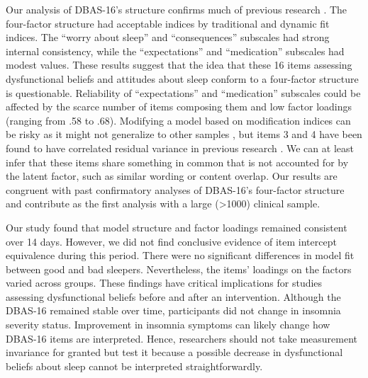 \documentclass[
  12pt,
  twoside,
  openright,
  a4paper,
  chapter=TITLE,
  section=TITLE,
  brazil]{abntex2}
\begin{document}
Our analysis of DBAS-16's structure confirms much of previous research
\autocite{morin2007a,castillo2023,boysan2010}. The four-factor structure
had acceptable indices by traditional and dynamic fit indices. The
``worry about sleep'' and ``consequences'' subscales had strong internal
consistency, while the ``expectations'' and ``medication'' subscales had
modest values. These results suggest that the idea that these 16 items
assessing dysfunctional beliefs and attitudes about sleep conform to a
four-factor structure is questionable. Reliability of ``expectations''
and ``medication'' subscales could be affected by the scarce number of
items composing them and low factor loadings (ranging from .58 to .68).
Modifying a model based on modification indices can be risky as it might
not generalize to other samples \autocite{maccallum1992}, but items 3
and 4 have been found to have correlated residual variance in previous
research \autocite{morin2007a,boysan2010,castillo2023}. We can at least
infer that these items share something in common that is not accounted
for by the latent factor, such as similar wording or content overlap.
Our results are congruent with past confirmatory analyses of DBAS-16's
four-factor structure and contribute as the first analysis with a large
(\textgreater1000) clinical sample.

Our study found that model structure and factor loadings remained
consistent over 14 days. However, we did not find conclusive evidence of
item intercept equivalence during this period. There were no significant
differences in model fit between good and bad sleepers. Nevertheless,
the items' loadings on the factors varied across groups. These findings
have critical implications for studies assessing dysfunctional beliefs
before and after an intervention. Although the DBAS-16 remained stable
over time, participants did not change in insomnia severity status.
Improvement in insomnia symptoms can likely change how DBAS-16 items are
interpreted. Hence, researchers should not take measurement invariance
for granted but test it because a possible decrease in dysfunctional
beliefs about sleep cannot be interpreted straightforwardly.
\end{document}
